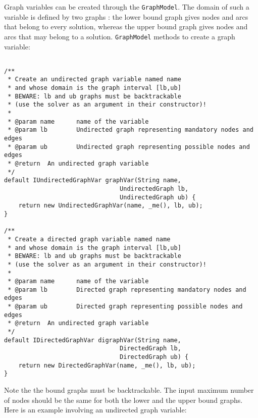 \documentclass{article}
\begin{document}
Graph variables can be created through the \texttt{GraphModel}. The domain of such a variable is defined by two graphs : the lower bound graph gives nodes and arcs that belong to every solution, whereas the upper bound graph gives nodes and arcs that may belong to a solution. \texttt{GraphModel} methods to create a graph variable:

\begin{lstlisting}

/**
 * Create an undirected graph variable named name
 * and whose domain is the graph interval [lb,ub]
 * BEWARE: lb and ub graphs must be backtrackable
 * (use the solver as an argument in their constructor)!
 *
 * @param name		name of the variable
 * @param lb		Undirected graph representing mandatory nodes and edges
 * @param ub		Undirected graph representing possible nodes and edges
 * @return	An undirected graph variable
 */
default IUndirectedGraphVar graphVar(String name, 
								UndirectedGraph lb, 
								UndirectedGraph ub) {
	return new UndirectedGraphVar(name, _me(), lb, ub);
}

/**
 * Create a directed graph variable named name
 * and whose domain is the graph interval [lb,ub]
 * BEWARE: lb and ub graphs must be backtrackable
 * (use the solver as an argument in their constructor)!
 *
 * @param name		name of the variable
 * @param lb		Directed graph representing mandatory nodes and edges
 * @param ub		Directed graph representing possible nodes and edges
 * @return	An undirected graph variable
 */
default IDirectedGraphVar digraphVar(String name, 
								DirectedGraph lb, 
								DirectedGraph ub) {
	return new DirectedGraphVar(name, _me(), lb, ub);
}
\end{lstlisting}

Note the the bound graphs must be backtrackable. The input maximum number of nodes should be the same for both the lower and the upper bound graphs. 
%
%
Here is an example involving an undirected graph variable:
\end{document}
